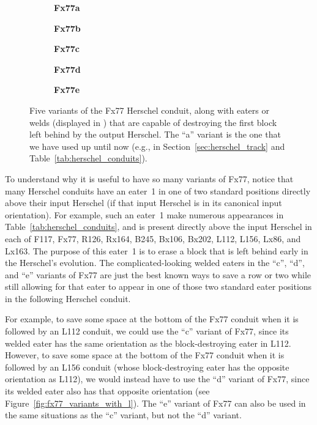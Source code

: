 \begin{figure}[!htb]
	\centering
	\begin{subfigure}{.18\textwidth}
		\centering
		\caption{\textbf{Fx77a}}
		\label{fig:fx77_a}
	\end{subfigure}\quad%
	\begin{subfigure}{.18\textwidth}
		\centering
		\caption{\textbf{Fx77b}}
		\label{fig:fx77_b}
	\end{subfigure}\quad%
	\begin{subfigure}{.18\textwidth}
		\centering
		\caption{\textbf{Fx77c}}
		\label{fig:fx77_c}
	\end{subfigure}\quad%
	\begin{subfigure}{.18\textwidth}
		\centering
		\caption{\textbf{Fx77d}}
		\label{fig:fx77_d}
	\end{subfigure}\quad%
	\begin{subfigure}{.18\textwidth}
		\centering
		\caption{\textbf{Fx77e}}
		\label{fig:fx77_e}
	\end{subfigure}
	\caption{Five variants of the Fx77 Herschel conduit, along with eaters or welds (displayed in ) that are capable of destroying the first block left behind by the output Herschel. The ``a'' variant is the one that we have used up until now (e.g., in Section~\ref{sec:herschel_track} and Table~\ref{tab:herschel_conduits}).}\label{fig:fx77_variants}
\end{figure}

To understand why it is useful to have so many variants of Fx77, notice that many Herschel conduits have an eater~1 in one of two standard positions directly above their input Herschel (if that input Herschel is in its canonical input orientation). For example, such an eater~1 make numerous appearances in Table~\ref{tab:herschel_conduits}, and is present directly above the input Herschel in each of F117, Fx77, R126, Rx164, B245, Bx106, Bx202, L112, L156, Lx86, and Lx163. The purpose of this eater~1 is to erase a block that is left behind early in the Herschel's evolution. The complicated-looking welded eaters in the ``c'', ``d'', and ``e'' variants of Fx77 are just the best known ways to save a row or two while still allowing for that eater to appear in one of those two standard eater positions in the following Herschel conduit.

For example, to save some space at the bottom of the Fx77 conduit when it is followed by an L112 conduit, we could use the ``c'' variant of Fx77, since its welded eater has the same orientation as the block-destroying eater in L112. However, to save some space at the bottom of the Fx77 conduit when it is followed by an L156 conduit (whose block-destroying eater has the opposite orientation as L112), we would instead have to use the ``d'' variant of Fx77, since its welded eater also has that opposite orientation (see Figure~\ref{fig:fx77_variants_with_l}). The ``e'' variant of Fx77 can also be used in the same situations as the ``c'' variant, but not the ``d'' variant.

